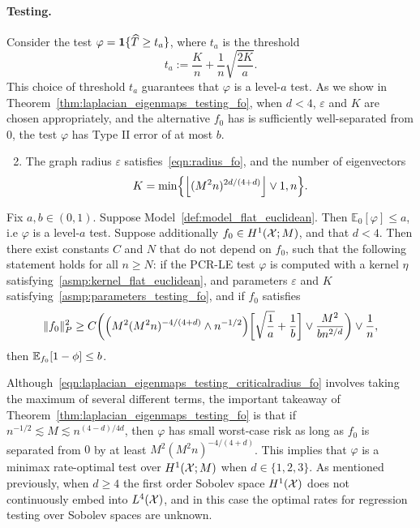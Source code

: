 \paragraph{Testing.} Consider the test $\varphi = \mathbf{1}\{\widehat{T} \geq t_{a}\}$, where $t_{a}$ is the threshold
\begin{equation*}
t_{a} := \frac{K}{n} + \frac{1}{n}\sqrt{\frac{2K}{a}}.
\end{equation*}
This choice of threshold $t_{a}$ guarantees that $\varphi$ is a level-$a$ test. As we show in Theorem~\ref{thm:laplacian_eigenmaps_testing_fo}, when $d < 4$, $\varepsilon$ and $K$ are chosen appropriately, and the alternative $f_0$ has is sufficiently well-separated from $0$, the test $\varphi$ has Type II error of at most $b$.

\begin{enumerate}[label=(P\arabic*)]
	\setcounter{enumi}{1}
	\item 
	\label{asmp:parameters_testing_fo}
	The graph radius $\varepsilon$ satisfies~\eqref{eqn:radius_fo}, and the number of eigenvectors 
	\begin{equation}
	\label{eqn:eigenvector_testing_fo}
	K = \min\Bigl\{\left\lfloor (M^2n)^{2d/(4 + d)} \right\rfloor \vee 1, n\Bigr\}.
	\end{equation}
\end{enumerate}
\begin{theorem}
	\label{thm:laplacian_eigenmaps_testing_fo}
	Fix $a,b \in (0,1)$. Suppose Model~\ref{def:model_flat_euclidean}. Then $\mathbb{E}_0[\varphi] \leq a$, i.e $\varphi$ is a level-$a$ test. Suppose additionally $f_0 \in H^1(\mathcal{X};M)$, and that $d < 4$. Then there exist constants $C$ and $N$ that do not depend on $f_0$, such that the following statement holds for all $n \geq N$: if the PCR-LE test $\varphi$ is computed with a kernel $\eta$ satisfying~\ref{asmp:kernel_flat_euclidean}, and parameters $\varepsilon$ and $K$ satisfying~\ref{asmp:parameters_testing_fo}, and if $f_0$ satisfies
	\begin{equation}
	\label{eqn:laplacian_eigenmaps_testing_criticalradius_fo}
	\|f_0\|_P^2 \geq C\biggl(\Bigl(M^2(M^2n)^{-4/(4 + d) } \wedge n^{-1/2}\Bigr)\biggl[\sqrt{\frac{1}{a}} + \frac{1}{b}\biggr] \vee \frac{M^2}{b n^{2/d}} \biggr) \vee \frac{1}{n},
	\end{equation}
	then $\mathbb{E}_{f_0}[1 - \phi] \leq b$.
\end{theorem}
Although~\eqref{eqn:laplacian_eigenmaps_testing_criticalradius_fo} involves taking the maximum of several different terms, the important takeaway of Theorem~\ref{thm:laplacian_eigenmaps_testing_fo} is that if $n^{-1/2} \lesssim M \lesssim n^{(4 - d)/4d}$, then $\varphi$ has small worst-case risk as long as $f_0$ is separated from $0$ by at least $M^2(M^2n)^{-4/(4 + d)}$. This implies that $\varphi$ is a minimax rate-optimal test over $H^1(\mathcal{X};M)$ when $d \in \{1,2,3\}$. As mentioned previously, when $d \geq 4$ the first order Sobolev space $H^1(\mathcal{X})$ does not continuously embed into $L^4(\mathcal{X})$, and in this case the optimal rates for regression testing over Sobolev spaces are unknown.

